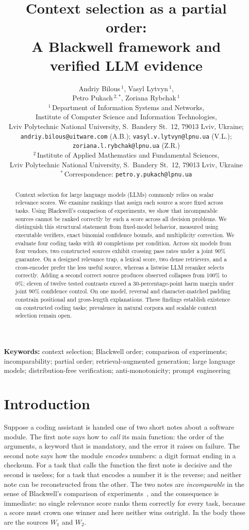 \documentclass[11pt]{article}
\title{Context selection as a partial order:\\
A Blackwell framework and verified LLM evidence}
\author{%
  Andriy Bilous\,$^{1}$\orcidlink{0009-0006-5467-7932},\quad
  Vasyl Lytvyn\,$^{1}$\orcidlink{0000-0002-9676-0180}, \\[2pt]
  Petro Pukach\,$^{2,\ast}$\orcidlink{0000-0002-0359-5025},\quad
  Zoriana Rybchak\,$^{1}$\orcidlink{0000-0002-5986-4618} \\[6pt]
  \normalsize $^{1}$\,Department of Information Systems and Networks, \\
  \normalsize Institute of Computer Science and Information Technologies, \\
  \normalsize Lviv Polytechnic National University, S.~Bandery St.~12, 79013 Lviv, Ukraine; \\
  \normalsize \texttt{andriy.bilous@uitware.com} (A.B.); \texttt{vasyl.v.lytvyn@lpnu.ua} (V.L.); \\
  \normalsize \texttt{zoriana.l.rybchak@lpnu.ua} (Z.R.) \\[3pt]
  \normalsize $^{2}$\,Institute of Applied Mathematics and Fundamental Sciences, \\
  \normalsize Lviv Polytechnic National University, S.~Bandery St.~12, 79013 Lviv, Ukraine \\[5pt]
  \normalsize $^{\ast}$\,Correspondence: \texttt{petro.y.pukach@lpnu.ua}
}
\date{}
\theoremstyle{plain}
\theoremstyle{definition}
\theoremstyle{remark}
\begin{document}
\maketitle

\begin{abstract}
Context selection for large language models (LLMs) commonly relies on scalar relevance scores. We
examine rankings that assign each source a score fixed across tasks. Using Blackwell's comparison
of experiments, we show that incomparable sources cannot be ranked correctly by such a score
across all decision problems. We distinguish this structural statement from fixed-model behavior,
measured using executable verifiers, exact binomial confidence bounds, and multiplicity
correction. We evaluate four coding tasks with 40 completions per condition. Across six models
from four vendors, two constructed sources exhibit crossing pass rates under a joint 90\%
guarantee. On a designed relevance trap, a lexical score, two dense retrievers, and a
cross-encoder prefer the less useful source, whereas a listwise LLM reranker selects correctly.
Adding a second correct source produces observed collapses from 100\% to 0\%; eleven of twelve
tested contrasts exceed a 30-percentage-point harm margin under joint 90\% confidence control. On
one model, reversal and character-matched padding constrain positional and gross-length
explanations. These findings establish existence on constructed coding tasks; prevalence in
natural corpora and scalable context selection remain open.
\end{abstract}

\vspace{0.6em}
\noindent\textbf{Keywords:} context selection; Blackwell order; comparison of experiments;
incomparability; partial order; retrieval-augmented generation; large language models;
distribution-free verification; anti-monotonicity; prompt engineering

\section{Introduction}
\label{sec:intro}

Suppose a coding assistant is handed one of two short notes about a software module. The first
note says how to \emph{call} its main function: the order of the arguments, a keyword that is
mandatory, and the error it raises on failure. The second note says how the module \emph{encodes}
numbers: a digit format ending in a checksum. For a task that calls the function the first note is
decisive and the second is useless; for a task that encodes a number it is the reverse; and
neither note can be reconstructed from the other. The two notes are \emph{incomparable} in the
sense of Blackwell's comparison of experiments~\citep{blackwell1953}, and the consequence is
immediate: no single relevance score ranks them correctly for every task, because a score must
crown one winner and here neither wins outright. In the body these are the sources $W_1$ and
$W_2$.
\end{document}
